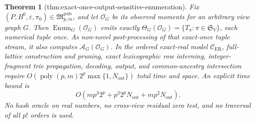 \documentclass{article}
\newtheorem{theorem}{Theorem}
\begin{document}
\begin{theorem}[thm:exact-once-output-sensitive-enumeration]\label{thm:exact-once-output-sensitive-enumeration}
Fix \((P,B^0,\varepsilon,\pi_0)\in\mathfrak M_{p,m}^{\mathrm{pub}}\), and let \(\mathcal O_G\) be its observed moments for an arbitrary view graph \(G\). Then \(\operatorname{Enum}_G(\mathcal O_G)\) emits exactly \(\Theta_G(\mathcal O_G)=\{T_\pi:\pi\in\mathfrak S_V\}\), each numerical tuple once. As non-novel post-processing of that exact-once tuple stream, it also computes \(\mathcal A_G(\mathcal O_G)\). In the ordered exact-real model \(\mathcal C_{\mathrm{ER}}\), full-lattice construction and pruning, exact lexicographic row interning, integer-fragment trie propagation, decoding, output, and common-ancestry intersection require \(O(\operatorname{poly}(p,m)2^p\max\{1,N_{\mathrm{out}}\})\) total time and space. An explicit time bound is
\[
 O\!\left(mp^3 2^p+p^3 2^pN_{\mathrm{out}}+mp^2N_{\mathrm{out}}\right).
\]
No hash oracle on real numbers, no cross-view residual zero test, and no traversal of all \(p!\) orders is used.
\end{theorem}
\end{document}
